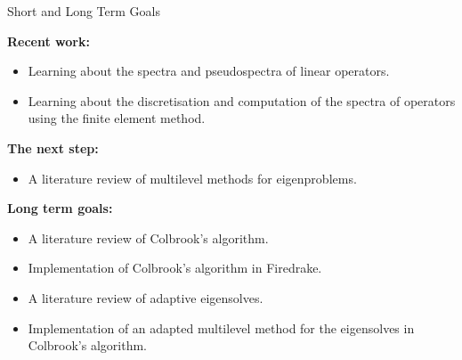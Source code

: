 \documentclass[aspectratio=169]{beamer}
\begin{document}
\begin{frame}{Short and Long Term Goals}

\textbf{Recent work:}
\begin{itemize}
    \item Learning about the spectra and pseudospectra of linear operators.
    \item Learning about the discretisation and computation of the spectra of operators using the finite element method. 
\end{itemize}



\textbf{The next step:}
\begin{itemize}
    \item A literature review of multilevel methods for eigenproblems.
\end{itemize}
\textbf{Long term goals:}
\begin{itemize}
     \item A literature review of Colbrook's algorithm.
     \item Implementation of Colbrook's algorithm in Firedrake.
     \item A literature review of adaptive eigensolves.
     \item Implementation of an adapted multilevel method for the eigensolves in Colbrook's algorithm.
\end{itemize}
\end{frame}
\end{document}
